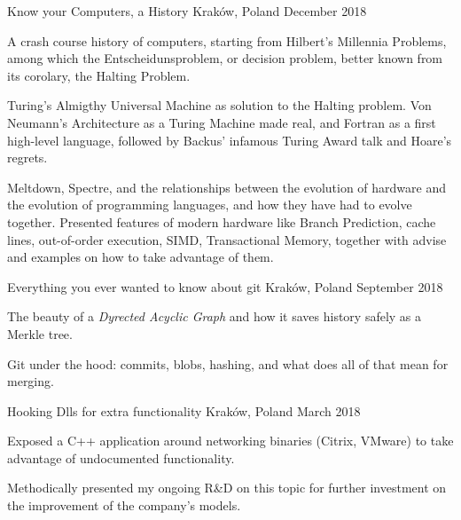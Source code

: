 \begin{cventries}
    {Know your Computers, a History} %
    {Kraków, Poland} %
    {December 2018} %
    {
        \begin{cvitems} %
        \item {A crash course history of computers, starting from Hilbert's Millennia Problems, among
                which the Entscheidunsproblem, or decision problem, better known from its
            corolary, the Halting Problem.}
        \item {Turing's Almigthy Universal Machine as solution to the Halting problem. Von Neumann's
                Architecture as a Turing Machine made real, and Fortran as a first high-level
            language, followed by Backus' infamous Turing Award talk and Hoare's regrets.}
        \item {Meltdown, Spectre, and the relationships between the evolution of hardware and the
                evolution of programming languages, and how they have had to evolve together.
                Presented features of modern hardware like Branch Prediction, cache lines,
                out-of-order execution, SIMD, Transactional Memory, together with advise and
            examples on how to take advantage of them.}
        \end{cvitems}
    }

    {Everything you ever wanted to know about git} %
    {Kraków, Poland} %
    {September 2018} %
    {
        \begin{cvitems} %
        \item {The beauty of a \textit{Dyrected Acyclic Graph} and how it saves history safely as a
            Merkle tree.}
        \item {Git under the hood: commits, blobs, hashing, and what does all of that mean for merging.}
        \end{cvitems}
    }

    {Hooking Dlls for extra functionality} %
    {Kraków, Poland} %
    {March 2018} %
    {
        \begin{cvitems} %
        \item {Exposed a C++ application around networking binaries (Citrix, VMware) to take
            advantage of undocumented functionality.}
        \item {Methodically presented my ongoing R\&D on this topic for further investment on the
            improvement of the company's models.}
        \end{cvitems}
    }


\end{cventries}
